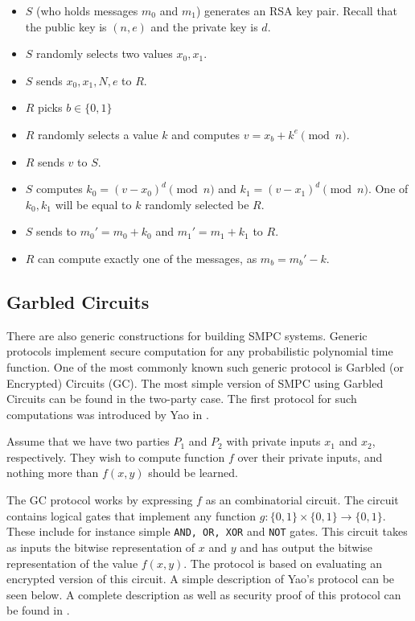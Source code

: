 \begin{itemize}
  \item $S$ (who holds messages $m_0$ and $m_1$) generates an RSA key pair. Recall that the public key is $(n,e)$ and the private key is $d$.
  \item $S$ randomly selects two values $x_0, x_1$.
  \item $S$ sends $x_0, x_1, N, e$ to $R$.
  \item $R$ picks $b \in \{0,1\}$
  \item $R$ randomly selects a value $k$ and computes $v = x_b + k^e \pmod{n}$.
  \item $R$ sends $v$ to $S$.
  \item $S$ computes $k_0 = (v-x_0)^d \pmod{n}$ and $k_1 = (v-x_1)^d \pmod{n}$. One of $k_0, k_1$ will be equal to $k$ randomly selected be $R$.
  \item $S$ sends to $m_0' = m_0 + k_0$ and $m_1' = m_1 + k_1$ to $R$.
  \item $R$ can compute exactly one of the messages, as $m_b = m_b' - k$.
\end{itemize}

\subsection{Garbled Circuits}
There are also generic constructions for building SMPC systems.
Generic protocols implement secure computation for any probabilistic polynomial time function.
One of the most commonly known such generic protocol is Garbled (or Encrypted) Circuits (GC).
The most simple version of SMPC using Garbled Circuits can be found in the two-party case.
The first protocol for such computations was introduced by Yao in \cite{yao1986generate}.

Assume that we have two parties $P_1$ and $P_2$ with private inputs $x_1$ and $x_2$, respectively.
They wish to compute function $f$ over their private inputs, and nothing more than $f(x,y)$ should be learned.

The GC protocol works by expressing $f$ as an combinatorial circuit.
The circuit contains logical gates that implement any function $g : \{0,1\} \times \{0,1\} \rightarrow \{0,1\}$.
These include for instance simple \texttt{AND, OR, XOR} and \texttt{NOT} gates.
This circuit takes as inputs the bitwise representation of $x$ and $y$ and has output the bitwise representation of the value $f(x,y)$.
The protocol is based on evaluating an encrypted version of this circuit.
A simple description of Yao's protocol can be seen below. A complete description as well as security proof of this protocol can be found in \cite{lindell2009proof}.

